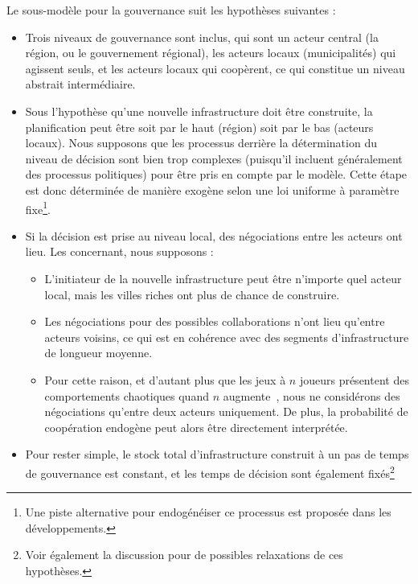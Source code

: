 {\begin{itemize}
\end{itemize}
}{
Le sous-modèle pour la gouvernance suit les hypothèses suivantes :
\begin{itemize}
	\item Trois niveaux de gouvernance sont inclus, qui sont un acteur central (la région, ou le gouvernement régional), les acteurs locaux (municipalités) qui agissent seuls, et les acteurs locaux qui coopèrent, ce qui constitue un niveau abstrait intermédiaire.%
	\item Sous l'hypothèse qu'une nouvelle infrastructure doit être construite, la planification peut être soit par le haut (région) soit par le bas (acteurs locaux). Nous supposons que les processus derrière la détermination du niveau de décision sont bien trop complexes (puisqu'il incluent généralement des processus politiques) pour être pris en compte par le modèle. Cette étape est donc déterminée de manière exogène selon une loi uniforme à paramètre fixe\footnote{Une piste alternative pour endogénéiser ce processus est proposée dans les développements.}.
	\item Si la décision est prise au niveau local, des négociations entre les acteurs ont lieu. Les concernant, nous supposons :
	\begin{itemize}
		\item L'initiateur de la nouvelle infrastructure peut être n'importe quel acteur local, mais les villes riches ont plus de chance de construire.
		\item Les négociations pour des possibles collaborations n'ont lieu qu'entre acteurs voisins, ce qui est en cohérence avec des segments d'infrastructure de longueur moyenne.
		\item Pour cette raison, et d'autant plus que les jeux à $n$ joueurs présentent des comportements chaotiques quand $n$ augmente~\cite{2016arXiv161208111S}, nous ne considérons des négociations qu'entre deux acteurs uniquement. De plus, la probabilité de coopération endogène peut alors être directement interprétée.
	\end{itemize}
	\item Pour rester simple, le stock total d'infrastructure construit à un pas de temps de gouvernance est constant, et les temps de décision sont également fixés\footnote{Voir également la discussion pour de possibles relaxations de ces hypothèses.}
\end{itemize}
}





